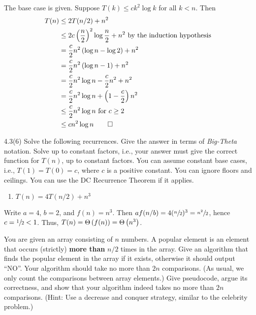 \documentclass[draft]{article}
\begin{document}
\begin{solution}
    The base case is given. Suppose $T(k) \leq ck^2\log{k}$ for all $k < n$. Then
    \begin{align*}T(n)
         & \leq 2T(n/2) + n^2                                                                        \\
         & \leq 2c\left(\frac{n}{2}\right)^2\log\frac{n}{2} + n^2\hbox{ by the induction hypothesis} \\
         & = \frac{c}{2}n^2\left(\log{n} - \log{2}\right) + n^2                                      \\
         & = \frac{c}{2}n^2\left(\log{n} - 1\right) + n^2                                            \\
         & = \frac{c}{2}n^2\log{n} -\frac{c}{2}n^2 + n^2                                             \\
         & = \frac{c}{2}n^2\log{n} + \left(1 - \frac{c}{2}\right)n^2                                 \\
         & \leq \frac{c}{2}n^2\log{n}\hbox{ for $c \geq 2$}                                          \\
         & \leq cn^2\log{n}\qedhere
    \end{align*}
\end{solution}

\begin{exercise}{4.3(6)}
    Solve the following recurrences. Give the answer in terms of \emph{Big-Theta} notation.  Solve up to constant
    factors, i.e., your answer must give the correct function for $T(n)$, up to constant factors.
    You can  assume constant base cases, i.e., $T(1) = T(0) = c$, where $c$ is a positive constant.
    You can ignore floors and ceilings. You can use the DC Recurrence Theorem if it applies.
    \begin{enumerate}[start=6, label=\arabic*.]
        \item $T(n) = 4 T(n/2) + n^3$
    \end{enumerate}
\end{exercise}

\begin{solution}
    Write $a = 4$, $b=2$, and $f(n) = n^3$. Then $af(n/b) = 4(\sfrac{n}{2})^3=\sfrac{n^2}{2}$, hence $c =\sfrac{1}{2} < 1$. Thus, $T(n) = \Theta\left(f(n)\right) = \Theta\left(n^3\right)$.
\end{solution}

\begin{exercise}{4.4}
    You are given an array consisting of $n$ numbers. A popular element is an element
    that occurs (strictly) \textbf{more than} $n/2$ times in the array. Give an algorithm that finds
    the popular element in the array if it exists, otherwise it should output ``NO''. Your algorithm should take no more than $2n$ comparisons. (As usual, we only count the comparisons between array elements.)
    Give pseudocode, argue its correctness, and show that your algorithm indeed takes no more than $2n$ comparisons.
    (Hint: Use a decrease and conquer strategy, similar to the celebrity problem.)
\end{exercise}
\end{document}

